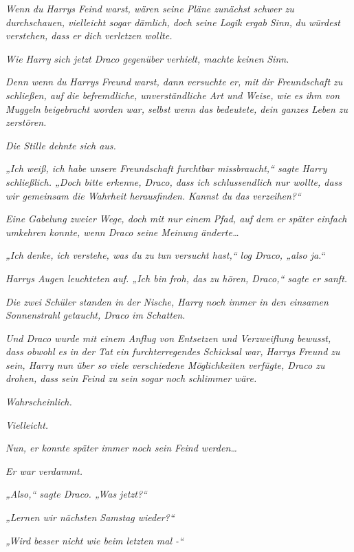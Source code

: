 {\emph{Wenn} \emph{du} \emph{Harrys Feind warst, wären seine Pläne zunächst schwer zu durchschauen, vielleicht sogar dämlich, doch seine Logik ergab} \emph{\emph{Sinn,}} \emph{du} \emph{würdest} \emph{verstehen, dass er} \emph{dich} \emph{verletzen wollte.}

\emph{Wie} \emph{Harry} \emph{sich jetzt Draco gegenüber verhielt, machte} \emph{\emph{keinen}} \emph{Sinn.}

\emph{Denn wenn} \emph{du} \emph{Harrys} \emph{\emph{Freund}} \emph{warst, dann versuchte er, mit} \emph{dir} \emph{Freundschaft zu schließen, auf die befremdliche, unverständliche Art und Weise, wie es ihm von Muggeln beigebracht worden war, selbst wenn das bedeutete, dein ganzes Leben zu zerstören.}

\emph{Die Stille dehnte sich aus.}

\emph{„Ich weiß, ich habe unsere Freundschaft furchtbar missbraucht,“ sagte Harry schließlich. „Doch bitte erkenne, Draco, dass ich schlussendlich nur wollte, dass wir gemeinsam die Wahrheit herausfinden. Kannst du das verzeihen?“}

\emph{Eine Gabelung zweier Wege, doch mit nur einem} \emph{Pfad, auf dem er später einfach umkehren konnte, wenn Draco seine Meinung änderte…}

\emph{„Ich denke, ich verstehe, was du} \emph{zu tun} \emph{versucht hast,“ log Draco, „also ja.“}

\emph{Harrys Augen leuchteten auf. „Ich bin froh, das zu hören, Draco,“ sagte er sanft.}

\emph{Die zwei Schüler standen in der Nische, Harry noch immer in den einsamen Sonnenstrahl getaucht, Draco im Schatten.}

\emph{Und Draco wurde mit einem Anflug von Entsetzen und Verzweiflung bewusst, dass obwohl es} \emph{in der Tat} \emph{ein furchterregendes Schicksal war,} \emph{Harrys Freund zu sein, Harry nun über so viele verschiedene Möglichkeiten verfügte, Draco zu drohen, dass sein Feind zu sein sogar} \emph{noch} \emph{\emph{schlimmer}} \emph{wäre.}

\emph{Wahrscheinlich.}

\emph{Vielleicht.}

\emph{Nun, er konnte später immer noch sein Feind werden…}

\emph{Er war verdammt.}

\emph{„Also,“ sagte Draco. „Was jetzt?“}

\emph{„Lernen wir nächsten Samstag wieder?“}

\emph{„Wird besser nicht wie beim letzten mal -“}

}
